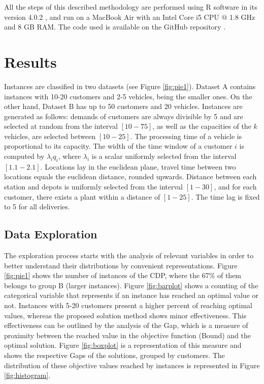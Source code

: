 \documentclass[5p,times]{elsarticle}
\begin{document}
	All the steps of this described methodology are performed using R software in its version 4.0.2 \citep{r}, and run on a MacBook Air with an Intel Core i5 CPU $ @ $ 1.8 GHz and 8 GB RAM. The code used is available on the GitHub repository \citep{github}.


\section{Results} \label{Section5}
	
	  Instances are classified in two datasets (see Figure \ref{fig:pie1}). Dataset A contains instances with 10-20 customers and 2-5 vehicles, being the smaller ones. On the other hand, Dataset B has up to 50 customers and 20 vehicles.  Instances are generated as follows: demands of customers are always divisible by 5 and are selected at random from the interval $  \left[ 10-75\right] $, as well as the capacities of the $ k $ vehicles, are selected between $ \left[ 10-25\right] $. The processing time of a vehicle is proportional to its capacity. The width of the time window of a customer $i$ is computed by $ \lambda_{i}q_{i} $, where $ \lambda_{i} $ is a scalar uniformly selected from the interval $\left[1.1-2.1\right]  $. Locations lay in the euclidean plane, travel time between two locations equals the euclidean distance, rounded upwards. Distance between each station and depots is uniformly selected from the interval $ \left[ 1-30\right ]$, and for each customer, there exists a plant within a distance of $ \left[ 1-25\right]   $. The time lag is fixed to 5 for all deliveries. 
	  
	\subsection{Data Exploration}
			
		The exploration process starts with the analysis of relevant variables in order to better understand their distributions by convenient representations. Figure \ref{fig:pie1} shows the number of instances of the CDP, where the 67\% of them belongs to group B (larger instances). Figure \ref{fig:barplot} shows a counting of the categorical variable that represents if an instance has reached an optimal value or not. Instances with 5-20 customers present a higher percent of reaching optimal values, whereas the proposed solution method shows minor effectiveness. This effectiveness can be outlined by the analysis of the Gap, which is a measure of proximity between the reached value in the objective function (Bound) and the optimal solution. Figure \ref{fig:boxplot} is a representation of this measure and shows the respective Gaps of the solutions, grouped by customers. The distribution of these objective values reached by instances is represented in Figure \ref{fig:histogram}.
			
\end{document}
